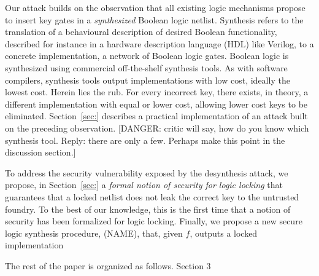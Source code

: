 Our attack builds on the observation that 
all existing 
logic mechanisms propose to insert key gates 
in a \emph{synthesized} 
Boolean logic netlist. 
Synthesis refers to 
the translation 
of a behavioural description of 
desired Boolean functionality, described for instance in 
a hardware description language (HDL) like Verilog, to a 
concrete implementation, a network 
of Boolean logic gates. Boolean logic is 
synthesized using 
commercial off-the-shelf synthesis tools. As with software 
compilers, synthesis tools output implementations with low 
cost, ideally the lowest cost. 
Herein lies the rub. For every incorrect key, 
there 
exists, in theory, a
different 
implementation with equal or lower cost, allowing 
lower cost keys to be eliminated. 
Section~\ref{sec:} describes a 
practical implementation of an attack built on the preceding 
observation. 
[DANGER: critic will say, how do you know which synthesis tool. 
Reply: there are only a few. Perhaps make this point in the 
discussion section.]


To address the security vulnerability exposed by the 
desynthesis attack,
we propose, in Section~\ref{sec:} 
a \emph{formal notion of security 
for logic locking} that 
guarantees that a locked netlist 
does not leak 
the correct key to the untrusted foundry.
To the 
best of our knowledge, this is the first time that 
a notion of security has been formalized for logic locking. 
Finally, we propose a new 
secure logic synthesis 
procedure, (NAME),   
that, given $f$, outputs a 
locked implementation  










 
   





 
 






The rest of the paper is organized as follows. Section 3 
